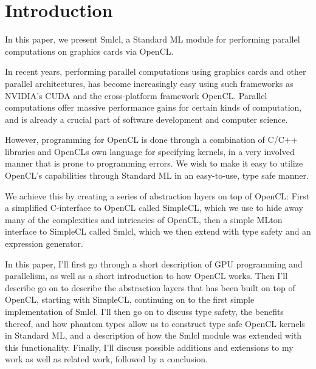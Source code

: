\section{Introduction}

In this paper, we present Smlcl, a Standard ML module for performing
parallel computations on graphics cards via OpenCL.

In recent years, performing parallel computations using graphics cards
and other parallel architectures, has become increasingly easy using
such frameworks as NVIDIA's CUDA and the cross-platform framework
OpenCL. Parallel computations offer massive performance gains for
certain kinds of computation, and is already a crucial part of
software development and computer science.

However, programming for OpenCL is done through a combination of C/C++
libraries and OpenCLs own language for specifying kernels, in a very
involved manner that is prone to programming errors. We wish to make
it easy to utilize OpenCL's capabilities through Standard ML in an
easy-to-use, type safe manner.

We achieve this by creating a series of abstraction layers on top of
OpenCL: First a simplified C-interface to OpenCL called SimpleCL,
which we use to hide away many of the complexities and intricacies of
OpenCL, then a simple MLton interface to SimpleCL called Smlcl, which
we then extend with type safety and an expression generator.

In this paper, I'll first go through a short description of GPU
programming and parallelism, as well as a short introduction to how
OpenCL works. Then I'll describe go on to describe the abstraction
layers that has been built on top of OpenCL, starting with SimpleCL,
continuing on to the first simple implementation of Smlcl. I'll then
go on to discuss type safety, the benefits thereof, and how phantom
types allow us to construct type safe OpenCL kernels in Standard ML,
and a description of how the Smlcl module was extended with this
functionality. Finally, I'll discuss possible additions and extensions
to my work as well as related work, followed by a conclusion.
